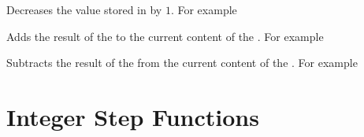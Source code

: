 \documentclass[oneside]{book}
\begin{document}
\begin{function}{\IntDecr}
\begin{syntax}
 
\end{syntax}
Decreases the value stored in  by $1$.
For example
\begin{demohigh}
\IntSet {}
\IntDecr \lTmpaInt
\IntUse \lTmpaInt
\end{demohigh}
\end{function}

\begin{function}{\IntAdd}
\begin{syntax}
  
\end{syntax}
Adds the result of the  to the current
content of the . For example
\begin{demohigh}
\IntSet {}
\IntAdd {}
\IntUse \lTmpaInt
\end{demohigh}
\end{function}

\begin{function}{\IntSub}
\begin{syntax}
  
\end{syntax}
Subtracts the result of the  from the
current content of the . For example
\begin{demohigh}
\IntSet {}
\IntSub {}
\IntUse \lTmpaInt
\end{demohigh}
\end{function}

\section{Integer Step Functions}
\end{document}

